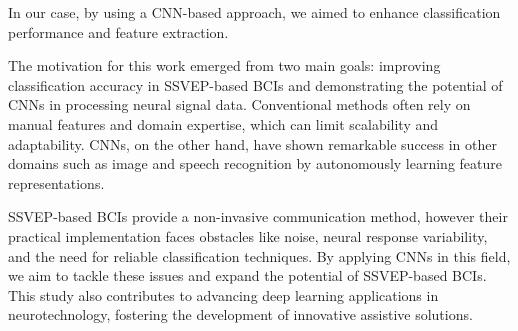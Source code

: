 In our case, by using a CNN-based approach, we aimed to enhance classification performance and feature extraction.

The motivation for this work emerged from two main goals: improving classification accuracy in SSVEP-based BCIs and demonstrating the potential of CNNs in processing neural signal data. Conventional methods often rely on manual features and domain expertise, which can limit scalability and adaptability. CNNs, on the other hand, have shown remarkable success in other domains such as image and speech recognition by autonomously learning feature representations.

SSVEP-based BCIs provide a non-invasive communication method, however their practical implementation faces obstacles like noise, neural response variability, and the need for reliable classification techniques. By applying CNNs in this field, we aim to tackle these issues and expand the potential of SSVEP-based BCIs. This study also contributes to advancing deep learning applications in neurotechnology, fostering the development of innovative assistive solutions.

